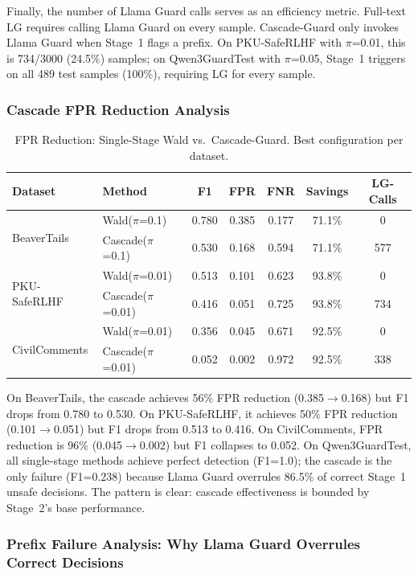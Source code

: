 \documentclass[acmtjournal, acmnowidth]{acmart}
\theoremstyle{definition}
\begin{document}
Finally, the number of Llama Guard calls serves as an efficiency metric. Full-text LG requires calling Llama Guard on every sample. Cascade-Guard only invokes Llama Guard when Stage~1 flags a prefix. On PKU-SafeRLHF with $\pi$=0.01, this is 734/3000 (24.5\%) samples; on Qwen3GuardTest with $\pi$=0.05, Stage~1 triggers on all 489 test samples (100\%), requiring LG for every sample.

\subsubsection{Cascade FPR Reduction Analysis}

\begin{table}[h]
\caption{FPR Reduction: Single-Stage Wald vs.\ Cascade-Guard. Best configuration per dataset.}
\label{tab:cascade_fpr}
\begin{tabular}{llccccc}
\toprule
Dataset & Method & F1 & FPR & FNR & Savings & LG-Calls \\
\midrule
\multirow{2}{*}{BeaverTails}
 & Wald($\pi$=0.1) & 0.780 & 0.385 & 0.177 & 71.1\% & 0 \\
 & Cascade($\pi$=0.1) & 0.530 & 0.168 & 0.594 & 71.1\% & 577 \\
\midrule
\multirow{2}{*}{PKU-SafeRLHF}
 & Wald($\pi$=0.01) & 0.513 & 0.101 & 0.623 & 93.8\% & 0 \\
 & Cascade($\pi$=0.01) & 0.416 & 0.051 & 0.725 & 93.8\% & 734 \\
\midrule
\multirow{2}{*}{CivilComments}
 & Wald($\pi$=0.01) & 0.356 & 0.045 & 0.671 & 92.5\% & 0 \\
 & Cascade($\pi$=0.01) & 0.052 & 0.002 & 0.972 & 92.5\% & 338 \\
\bottomrule
\end{tabular}
\end{table}

On BeaverTails, the cascade achieves 56\% FPR reduction (0.385$\to$0.168) but F1 drops from 0.780 to 0.530. On PKU-SafeRLHF, it achieves 50\% FPR reduction (0.101$\to$0.051) but F1 drops from 0.513 to 0.416. On CivilComments, FPR reduction is 96\% (0.045$\to$0.002) but F1 collapses to 0.052. On Qwen3GuardTest, all single-stage methods achieve perfect detection (F1=1.0); the cascade is the only failure (F1=0.238) because Llama Guard overrules 86.5\% of correct Stage~1 unsafe decisions. The pattern is clear: cascade effectiveness is bounded by Stage~2's base performance.

\subsubsection{Prefix Failure Analysis: Why Llama Guard Overrules Correct Decisions}
\label{sec:prefix_failures}
\end{document}
